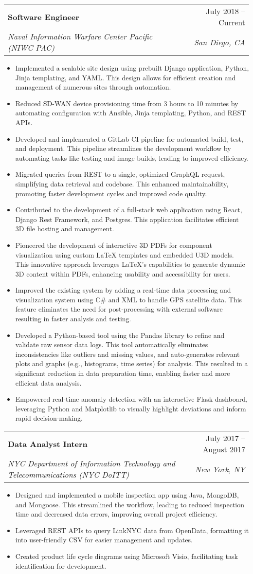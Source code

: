 \documentclass[letterpaper,11pt]{article}
\makeatletter
\newcommand{\resumeItem}[1]{
  \item\small{
    {#1 \vspace{-2pt}}
  }
}
\newcommand{\resumeSubheading}[4]{
  \vspace{-2pt}\item
    \begin{tabular*}{0.97\textwidth}[t]{l@{\extracolsep{\fill}}r}
      \textbf{#1} & #2 \\
      \textit{\small#3} & \textit{\small #4} \\
    \end{tabular*}\vspace{-7pt}
}
\newcommand{\resumeItemListStart}{\begin{itemize}}
\newcommand{\resumeItemListEnd}{\end{itemize}\vspace{-5pt}}
\makeatother
\begin{document}
    \resumeSubheading
      {Software Engineer}{July 2018 -- Current}
      {Naval Information Warfare Center Pacific (NIWC PAC)}{San Diego, CA}
      \resumeItemListStart
        \resumeItem{Implemented a scalable site design using prebuilt Django application, Python, Jinja templating, and YAML. This design allows for efficient creation and management of numerous sites through automation.}
        \resumeItem{Reduced SD-WAN device provisioning time from 3 hours to 10 minutes by automating configuration with Ansible, Jinja templating, Python, and REST APIs.}
        \resumeItem{Developed and implemented a GitLab CI pipeline for automated build, test, and deployment. This pipeline streamlines the development workflow by automating tasks like testing and image builds, leading to improved efficiency.}
        \resumeItem{Migrated queries from REST to a single, optimized GraphQL request, simplifying data retrieval and codebase. This enhanced maintainability, promoting faster development cycles and improved code quality.}
        \resumeItem{Contributed to the development of a full-stack web application using React, Django Rest Framework, and Postgres. This application facilitates efficient 3D file hosting and management.}
        \resumeItem{Pioneered the development of interactive 3D PDFs for component visualization using custom LaTeX templates and embedded U3D models. This innovative approach leverages LaTeX's capabilities to generate dynamic 3D content within PDFs, enhancing usability and accessibility for users.}
        \resumeItem{Improved the existing system by adding a real-time data processing and visualization system using C\# and XML to handle GPS satellite data. This feature eliminates the need for post-processing with external software resulting in faster analysis and testing.}
        \resumeItem{Developed a Python-based tool using the Pandas library to refine and validate raw sensor data logs. This tool automatically eliminates inconsistencies like outliers and missing values, and auto-generates relevant plots and graphs (e.g., histograms, time series) for analysis. This resulted in a significant reduction in data preparation time, enabling faster and more efficient data analysis.}
        \resumeItem{Empowered real-time anomaly detection with an interactive Flask dashboard, leveraging Python and Matplotlib to visually highlight deviations and inform rapid decision-making.}
    \resumeItemListEnd

    \resumeSubheading
      {Data Analyst Intern}{July 2017 -- August 2017}
      {NYC Department of Information Technology and Telecommunications (NYC DoITT)}{New York, NY}
      \resumeItemListStart
        \resumeItem{Designed and implemented a mobile inspection app using Java, MongoDB, and Mongoose. This streamlined the workflow, leading to reduced inspection time and decreased data errors, improving overall project efficiency.}
        \resumeItem{Leveraged REST APIs to query LinkNYC data from OpenData, formatting it into user-friendly CSV for easier management and updates.}
        \resumeItem{Created product life cycle diagrams using Microsoft Visio, facilitating task identification for development.}
      \resumeItemListEnd
\end{document}

